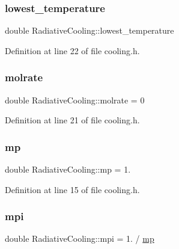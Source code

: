 \subsubsection{\texorpdfstring{lowest\+\_\+temperature}{lowest\_temperature}}
{\footnotesize\ttfamily double Radiative\+Cooling\+::lowest\+\_\+temperature\hspace{0.3cm}{\ttfamily [private]}}



Definition at line 22 of file cooling.\+h.

\mbox{\label{classRadiativeCooling_a1965ec0557b30cb94a6b087077d6515c}} 
\subsubsection{\texorpdfstring{molrate}{molrate}}
{\footnotesize\ttfamily double Radiative\+Cooling\+::molrate = 0\hspace{0.3cm}{\ttfamily [private]}}



Definition at line 21 of file cooling.\+h.

\mbox{\label{classRadiativeCooling_a73af212844c9db7d9ced561ce282c588}} 
\subsubsection{\texorpdfstring{mp}{mp}}
{\footnotesize\ttfamily double Radiative\+Cooling\+::mp = 1.\hspace{0.3cm}{\ttfamily [private]}}



Definition at line 15 of file cooling.\+h.

\mbox{\label{classRadiativeCooling_afeca5976d368a3e1bb3bff20feca3bce}} 
\subsubsection{\texorpdfstring{mpi}{mpi}}
{\footnotesize\ttfamily double Radiative\+Cooling\+::mpi = 1. / \hyperlink{classRadiativeCooling_a73af212844c9db7d9ced561ce282c588}{mp}\hspace{0.3cm}{\ttfamily [private]}}



